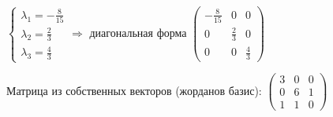 \begin{enumerate}
    $\displaystyle \begin{cases}
         \lambda_1 = -\frac{8}{15} \\
         \lambda_2 = \frac{2}{3}  \\
         \lambda_3 = \frac{4}{3}
    \end{cases} \Longrightarrow $ диагональная форма $\displaystyle
    \begin{pmatrix}
        -\frac{8}{15} & 0           & 0           \\
        0             & \frac{2}{3} & 0           \\
        0             & 0           & \frac{4}{3}
    \end{pmatrix}$

    Матрица из собственных векторов (жорданов базис): $\displaystyle \begin{pmatrix}
        3 & 0 & 0 \\
        0 & 6 & 1 \\
        1 & 1 & 0
    \end{pmatrix}$
\end{enumerate}

